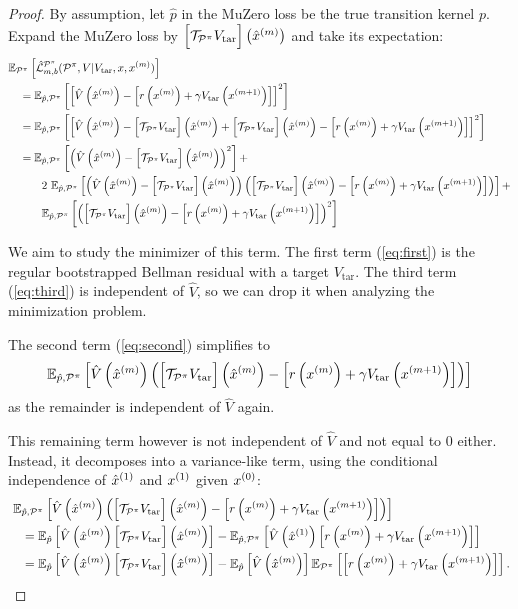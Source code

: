 \begin{proof}

By assumption, let $\hat{p}$ in the MuZero loss be the true transition kernel $p$. Expand the MuZero loss by $\target{m}$ and take its expectation:
\begin{align}
    &\EEX{\P^\pi}{\hat{\mathcal{L}}^{\P^\pi}_{m,b}(\P^\pi, V| V_{\mathrm{tar}}, x, x^{(m)})}\\ 
    &\quad = \EEX{\hat{p},\P^\pi}{\squareb{ \hat{V}\roundb{\mx{m}} - \TrV{m}}^2}\\
    &\quad = \EEX{\hat{p},\P^\pi}{\squareb{ \hat{V}\roundb{\mx{m}} - \target{m} + \target{m} - \TrV{m}  }^2}\\
    &\quad = \EEX{\hat{p},\P^\pi}{ \roundb{\hat{V}\roundb{\mx{m}} - \target{m}}^2}  +\label{eq:first}\\
    &\quad \quad \quad 2~\EEX{\hat{p},\P^\pi}{\roundb{\hat{V}\roundb{\mx{m}} - \target{m}}\roundb{\target{m} - \TrV{m}}} + \label{eq:second}\\
    &\quad \quad \quad \EEX{\hat{p},\P^\pi}{\roundb{\target{m} - \TrV{m}}^2}\label{eq:third}
\end{align}

We aim to study the minimizer of this term.
The first term (\autoref{eq:first}) is the regular bootstrapped Bellman residual with a target $V_\mathrm{tar}$.
The third term (\autoref{eq:third}) is independent of $\hat{V}$, so we can drop it when analyzing the minimization problem.

The second term (\autoref{eq:second}) simplifies to
\begin{align}
    \EEX{\hat{p},\P^\pi}{\hat{V}\roundb{\mx{m}}\roundb{\target{m} - \TrV{m}}}
\end{align}
as the remainder is independent of $\hat{V}$ again.

This remaining term however is not independent of $\hat{V}$ and not equal to $0$ either.
Instead, it decomposes into a variance-like term, using the conditional independence of $\mx{1}$ and $\px{1}$ given $\px{0}$:
\begin{align}
    &~\EEX{\hat{p},\P^\pi}{ \hat{V}\roundb{\mx{m}}\roundb{\target{m} - \TrV{m}}}\\
    &\quad =\EEX{\hat{p}}{ \hat{V}\roundb{\mx{m}}\target{m}} - \EEX{\hat{p},\P^\pi}{\hat{V}\roundb{\mx{1}}\TrV{m}}\\
    &\quad =\EEX{\hat{p}}{ \hat{V}\roundb{\mx{m}}\target{m}} - \EEX{\hat{p}}{\hat{V}\roundb{\mx{m}}} \EEX{\P^\pi}{\TrV{m}}.
\end{align}


\end{proof}
